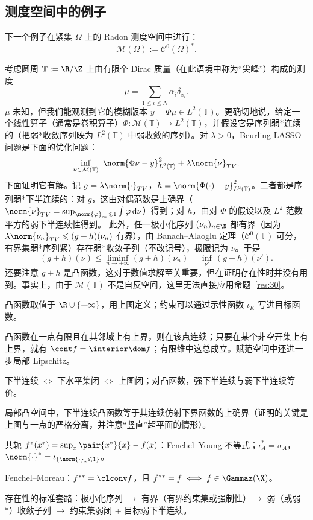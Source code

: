 \subsection*{测度空间中的例子}

下一个例子在紧集 $\Omega$ 上的 Radon 测度空间中进行：
\[
  \mathcal{M}(\Omega):=\mathcal{C}^0(\Omega)^* .
\]

\begin{example}
\label{exa:13}
考虑圆周 $\mathbb{T}:=\R/\Z$ 上由有限个 Dirac 质量（在此语境中称为“尖峰”）构成的测度
\[
  \mu=\sum_{1\leqslant i\leqslant N}\alpha_i\delta_{x_i}.
\]
$\mu$ 未知，但我们能观测到它的模糊版本 $y=\Phi\mu\in L^2(\mathbb{T})$。更确切地说，给定一个线性算子（通常是卷积算子）$\Phi:\mathcal{M}(\mathbb{T})\to L^2(\mathbb{T})$，并假设它是序列弱*连续的（把弱*收敛序列映为 $L^2(\mathbb{T})$ 中弱收敛的序列）。对 $\lambda>0$，Beurling LASSO 问题是下面的优化问题：
\[
  \inf_{\nu\in\mathcal{M}(\mathbb{T})}\ \norm{\Phi\nu-y}_{L^2(\mathbb{T})}^2+\lambda\norm{\nu}_{TV} .
\]
下面证明它有解。记 $g=\lambda\norm{\cdot}_{TV}$，$h=\norm{\Phi(\cdot)-y}_{L^2(\mathbb{T})}^2$。二者都是序列弱*下半连续的：对 $g$，这由对偶范数是上确界（$\norm{\nu}_{TV}=\sup_{\norm{\varphi}_\infty\leqslant1}\int\varphi\,\mathrm{d}\nu$）得到；对 $h$，由对 $\Phi$ 的假设以及 $L^2$ 范数平方的弱下半连续性得到。
此外，任一极小化序列 $(\nu_n)_{n\in\N}$ 都有界（因为 $\lambda\norm{\nu_n}_{TV}\leqslant(g+h)(\nu_n)$ 有界），由 Banach--Alaoglu 定理（$\mathcal{C}^0(\mathbb{T})$ 可分，有界集弱*序列紧）存在弱*收敛子列（不改记号），极限记为 $\nu$。于是
\[
  (g+h)(\nu)\leqslant\liminf_{n\to+\infty}(g+h)(\nu_n)=\inf_{\nu'}\,(g+h)(\nu').
\]
还要注意 $g+h$ 是凸函数，这对于数值求解至关重要，但在证明存在性时并没有用到。事实上，由于 $\mathcal{M}(\mathbb{T})$ 不是自反空间，这里无法直接应用命题~\ref{res:30}。
\end{example}

\begin{keypoints}
  \item 凸函数取值于 $\R\cup\{+\infty\}$，用上图定义；约束可以通过示性函数 $\iota_K$ 写进目标函数。
  \item 凸函数在一点有限且在其邻域上有上界，则在该点连续；只要在某个非空开集上有上界，就有 $\cont f=\interior\dom f$；有限维中这总成立。赋范空间中还进一步局部 Lipschitz。
  \item 下半连续 $\iff$ 下水平集闭 $\iff$ 上图闭；对凸函数，强下半连续与弱下半连续等价。
  \item 局部凸空间中，下半连续凸函数等于其连续仿射下界函数的上确界（证明的关键是上图与一点的严格分离，并注意“竖直”超平面的情形）。
  \item 共轭 $f^*(x^*)=\sup_x\pair{x^*}{x}-f(x)$：Fenchel--Young 不等式；$\iota_A^*=\sigma_A$，$\norm{\cdot}^*=\iota_{\{\norm{\cdot}_*\leqslant1\}}$。
  \item Fenchel--Moreau：$f^{**}=\clconv f$，且 $f^{**}=f\iff f\in\Gammaz(\X)$。
  \item 存在性的标准套路：极小化序列 $\to$ 有界（有界约束集或强制性）$\to$ 弱（或弱*）收敛子列 $\to$ 约束集弱闭 + 目标弱下半连续。
\end{keypoints}
